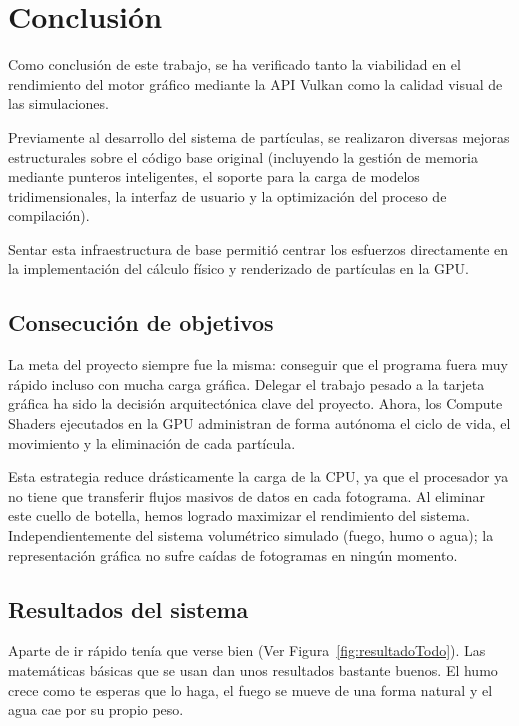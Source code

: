 \chapter{Conclusión}
\label{cap:conclusiones}

Como conclusión de este trabajo, se ha verificado tanto la viabilidad en el rendimiento del motor gráfico mediante la API Vulkan como la calidad visual de las simulaciones. 

Previamente al desarrollo del sistema de partículas, se realizaron diversas mejoras estructurales sobre el código base original (incluyendo la gestión de memoria mediante punteros inteligentes, el soporte para la carga de modelos tridimensionales, la interfaz de usuario y la optimización del proceso de compilación). 

Sentar esta infraestructura de base permitió centrar los esfuerzos directamente en la implementación del cálculo físico y renderizado de partículas en la GPU.

\section{Consecución de objetivos}

La meta del proyecto siempre fue la misma: conseguir que el programa fuera muy rápido incluso con mucha carga gráfica. 
Delegar el trabajo pesado a la tarjeta gráfica ha sido la decisión arquitectónica clave del proyecto. Ahora, los Compute Shaders ejecutados en la GPU administran de forma autónoma el ciclo de vida, el movimiento y la eliminación de cada partícula.

Esta estrategia reduce drásticamente la carga de la CPU, ya que el procesador ya no tiene que transferir flujos masivos de datos en cada fotograma. Al eliminar este cuello de botella, hemos logrado maximizar el rendimiento del sistema.
Independientemente del sistema volumétrico simulado (fuego, humo o agua); la representación gráfica no sufre caídas de fotogramas en ningún momento.

\section{Resultados del sistema} 

Aparte de ir rápido tenía que verse bien (Ver Figura~\ref{fig:resultadoTodo}). Las matemáticas básicas que se usan dan unos resultados bastante buenos.
El humo crece como te esperas que lo haga, el fuego se mueve de una forma natural y el agua cae por su propio peso. 

